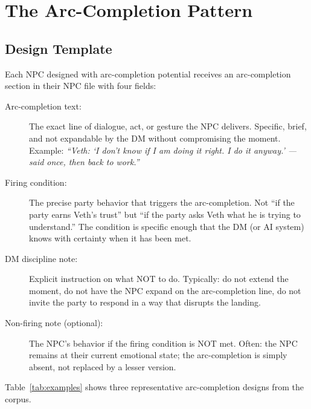 
\section{The Arc-Completion Pattern}
\label{sec:pattern}

\subsection{Design Template}

Each NPC designed with arc-completion potential receives an arc-completion section
in their NPC file with four fields:

\begin{description}
  \item[Arc-completion text:] The exact line of dialogue, act, or gesture the NPC
    delivers. Specific, brief, and not expandable by the DM without compromising the
    moment. Example: \textit{``Veth: `I don't know if I am doing it right. I do it
    anyway.' --- said once, then back to work.''}

  \item[Firing condition:] The precise party behavior that triggers the arc-completion.
    Not ``if the party earns Veth's trust'' but ``if the party asks Veth what he is
    trying to understand.'' The condition is specific enough that the DM (or AI system)
    knows with certainty when it has been met.

  \item[DM discipline note:] Explicit instruction on what NOT to do. Typically: do not
    extend the moment, do not have the NPC expand on the arc-completion line, do not
    invite the party to respond in a way that disrupts the landing.

  \item[Non-firing note (optional):] The NPC's behavior if the firing condition is NOT
    met. Often: the NPC remains at their current emotional state; the arc-completion is
    simply absent, not replaced by a lesser version.
\end{description}

Table~\ref{tab:examples} shows three representative arc-completion designs from the
corpus.

